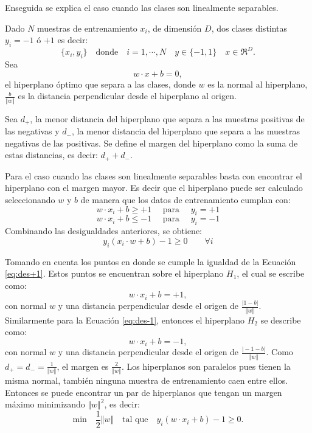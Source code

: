 Enseguida se explica el caso cuando las clases son linealmente separables.

Dado $N$ muestras de entrenamiento $x_i$, de dimensión $D$, dos clases distintas $y_i=-1$ ó $+1$ es decir: 
$$\lbrace x_i,y_i \rbrace \quad \text{donde} \quad  i=1, \cdots ,N \quad y\in \lbrace -1,1 \rbrace \quad x \in \Re^D.$$
Sea  
\begin{equation}\label{eq:hiper}
w \cdot x + b = 0 ,
\end{equation}  
el hiperplano óptimo que separa a las clases, donde $w$ es la normal al hiperplano, $\frac{b}{ \Vert w \Vert}$ es la distancia perpendicular desde el hiperplano al origen.

Sea $d_+$, la menor distancia del hiperplano que separa a las muestras positivas de las negativas y $d_-$, la menor distancia del hiperplano que separa a las muestras negativas de las positivas. Se define el margen del hiperplano como la suma de estas distancias, es decir: $d_+ + d_-$.

Para el caso cuando las clases son linealmente separables basta con encontrar el hiperplano con el margen mayor. Es decir que el hiperplano puede ser calculado seleccionando $w$ y $b$ de manera que los datos de entrenamiento cumplan con:  
\begin{equation}\label{eq:des+1}
w \cdot x_i + b \geqslant +1 \quad \textrm{ para } \quad y_i=+1
\end{equation} 
\begin{equation}\label{eq:des-1}
w \cdot x_i + b \leqslant -1 \quad \textrm{ para } \quad y_i=-1
\end{equation} 
Combinando las desigualdades anteriores, se obtiene:  
\begin{equation}
y_i(x_i \cdot w + b) -1 \geqslant 0 \qquad \forall i 
\end{equation} 

Tomando en cuenta los puntos en donde se cumple la igualdad de la Ecuación \ref{eq:des+1}. Estos puntos se encuentran sobre el hiperplano $H_1$, el cual se escribe como: 
\begin{equation}\label{eq:eq+1}
w \cdot x_i + b = +1,  
\end{equation} 
con normal $w$ y una distancia perpendicular desde el origen de $\frac{\vert 1-b \vert}{ \Vert w \Vert}$. 
Similarmente para la Ecuación \ref{eq:des-1}, entonces el hiperplano $H_2$ se describe como: 
\begin{equation}\label{eq:eq+1}
w \cdot x_i + b = -1,  
\end{equation} 
con normal $w$ y una distancia perpendicular desde el origen de $\frac{\vert-1-b\vert}{ \Vert w \Vert}$.
Como $d_+ = d_- = \frac{1}{\Vert w \Vert}$, el margen es $\frac{2}{\Vert w \Vert}$. Los hiperplanos son paralelos pues tienen la misma normal, también ninguna muestra de entrenamiento caen entre ellos. Entonces se puede encontrar un par de hiperplanos  que tengan un margen máximo minimizando $\Vert w \Vert^2$, es decir:  
\begin{equation}
\text{min} \quad \frac{1}{2} \Vert w \Vert \quad \text{tal que} \quad y_i(w \cdot x_i + b) -1 \geq 0.
\end{equation}  


\newpage
